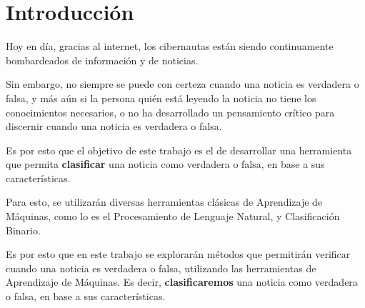 \section{Introducción}
{

Hoy en día, gracias al internet, los cibernautas están siendo continuamente bombardeados de información y de noticias.

Sin embargo, no siempre se puede con certeza cuando una noticia es verdadera o falsa, y más aún si la persona quién
está leyendo la noticia no tiene los conocimientos necesarios, o no ha desarrollado un pensamiento crítico para discernir 
cuando una noticia es verdadera o falsa.

Es por esto que el objetivo de este trabajo es el de desarrollar una herramienta que permita \textbf{clasificar} una noticia como verdadera o falsa, en base a sus características.

Para esto, se utilizarán diversas herramientas clásicas de Aprendizaje de Máquinas, como lo es el Procesamiento de Lenguaje Natural, y Clasificación Binario.   


Es por esto que en este trabajo se explorarán métodos que permitirán verificar cuando una noticia es verdadera o falsa, utilizando las
herramientas de Aprendizaje de Máquinas. Es decir, \textbf{clasificaremos} una noticia como verdadera o falsa, en base a sus características.


}



